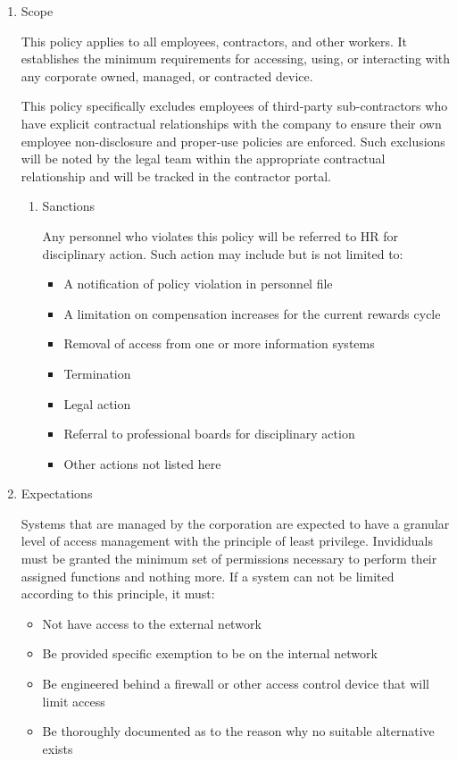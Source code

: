 \documentclass[stu]{apa7}
\begin{document}
\begin{enumerate}
\item Scope
\label{sec:org3691ce8}

This policy applies to all employees, contractors, and other workers. It establishes the minimum requirements for accessing, using, or interacting with any corporate owned, managed, or contracted device.

This policy specifically excludes employees of third-party sub-contractors who have explicit contractual relationships with the company to ensure their own employee non-disclosure and proper-use policies are enforced. Such exclusions will be noted by the legal team within the appropriate contractual relationship and will be tracked in the contractor portal.

\begin{enumerate}
\item Sanctions
\label{sec:org525f42b}

Any personnel who violates this policy will be referred to HR for disciplinary action. Such action may include but is not limited to:

\begin{itemize}
\item A notification of policy violation in personnel file
\item A limitation on compensation increases for the current rewards cycle
\item Removal of access from one or more information systems
\item Termination
\item Legal action
\item Referral to professional boards for disciplinary action
\item Other actions not listed here
\end{itemize}
\end{enumerate}

\item Expectations
\label{sec:org092f16c}

Systems that are managed by the corporation are expected to have a granular level of access management with the principle of least privilege. Invididuals must be granted the minimum set of permissions necessary to perform their assigned functions and nothing more. If a system can not be limited according to this principle, it must:

\begin{itemize}
\item Not have access to the external network
\item Be provided specific exemption to be on the internal network
\item Be engineered behind a firewall or other access control device that will limit access
\item Be thoroughly documented as to the reason why no suitable alternative exists
\end{itemize}


\end{enumerate}
\end{document}
